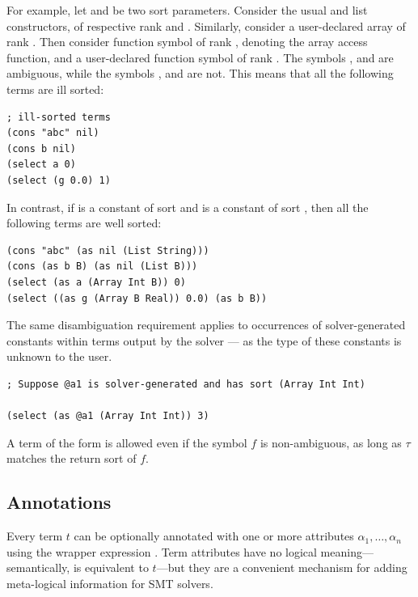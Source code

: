 For example, let  and  be two sort parameters.
Consider the usual  and  list constructors,
of respective rank  and .
Similarly, consider a user-declared array  
of rank . 
%
Then consider function symbol  of rank ,
denoting the array access function, and
a user-declared function symbol  of rank .
The symbols ,  and  are ambiguous, 
while the symbols ,  and  are not.
This means that all the following terms are ill sorted:

\begin{lstlisting}[linewidth=35.5em]
; ill-sorted terms
(cons "abc" nil)
(cons b nil)
(select a 0)
(select (g 0.0) 1)
\end{lstlisting}

\noindent In contrast, if 
 is a constant of sort  and
 is a constant of sort , then
all the following terms are well sorted:

\begin{lstlisting}[linewidth=35.5em]
(cons "abc" (as nil (List String)))
(cons (as b B) (as nil (List B)))
(select (as a (Array Int B)) 0)
(select ((as g (Array B Real)) 0.0) (as b B))
\end{lstlisting}

The same disambiguation requirement applies to occurrences of 
solver-generated constants within terms output by the solver ---
as the type of these constants is unknown to the user.

\begin{lstlisting}[linewidth=40em]
; Suppose @a1 is solver-generated and has sort (Array Int Int)

(select (as @a1 (Array Int Int)) 3)
\end{lstlisting}

\begin{remark}
  A term of the form  is allowed even if the symbol $f$ is non-ambiguous, as long as $\tau$ matches the return sort of $f$.
\end{remark}

\subsection{Annotations}
Every term $t$ can be optionally annotated with one or more attributes 
$\alpha_1,\ldots,\alpha_n$
using the wrapper expression .
Term attributes have no logical meaning---semantically,
 is equivalent to $t$---but 
they are a convenient mechanism for adding meta-logical information 
for SMT solvers.

